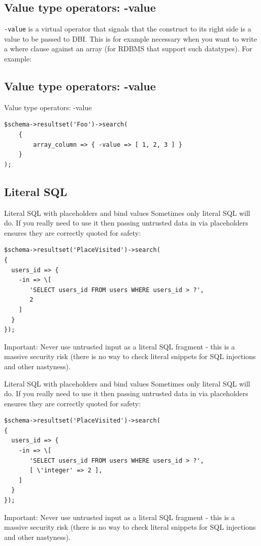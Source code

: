 \subsection{Value type operators: -value}

\verb|-value| is a virtual operator that signals that the construct to its right
side is a value to be passed to DBI. This is for example necessary when you
want to write a where clause against an array (for RDBMS that support such
datatypes). For example:

\subsection{Value type operators: -value}
\begin{frame}[fragile]{Value type operators: -value}
\begin{lstlisting}
$schema->resultset('Foo')->search(
    {
        array_column => { -value => [ 1, 2, 3 ] }
    }
);
\end{lstlisting}
\end{frame}

\subsection{Literal SQL}

\begin{frame}[fragile]{Literal SQL with placeholders and bind values}
Sometimes only literal SQL will do. 
If you really need to  use it then passing untrusted data in via placeholders ensures they are correctly quoted for safety:

\begin{lstlisting}
$schema->resultset('PlaceVisited')->search(
{
  users_id => {
    -in => \[
       'SELECT users_id FROM users WHERE users_id > ?',
       2
    ]
  }
});
\end{lstlisting}

Important: Never use untrusted input as a literal SQL fragment - this is a
massive security risk (there is no way to check literal snippets for SQL
injections and other nastyness).

\end{frame}

\begin{frame}[fragile]{Literal SQL with placeholders and bind values}
Sometimes only literal SQL will do. 
If you really need to  use it then passing untrusted data in via placeholders ensures they are correctly quoted for safety:

\begin{lstlisting}
$schema->resultset('PlaceVisited')->search(
{
  users_id => {
    -in => \[
       'SELECT users_id FROM users WHERE users_id > ?',
       [ \'integer' => 2 ],
    ]
  }
});
\end{lstlisting}

Important: Never use untrusted input as a literal SQL fragment - this is a
massive security risk (there is no way to check literal snippets for SQL
injections and other nastyness).

\end{frame}


